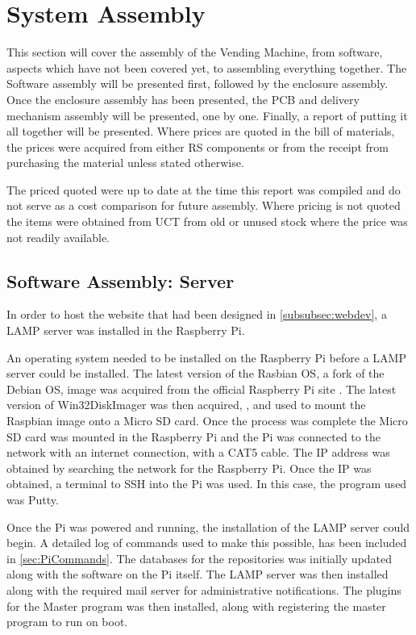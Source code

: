\documentclass[a4paper,11pt]{article}
\numberwithin{figure}{section}
\numberwithin{table}{section}
\begin{document}
\newpage

\section{System Assembly}\thispagestyle{sectionstart}
This section will cover the assembly of the Vending Machine, from software, aspects which have not been covered yet, to assembling everything together. The Software assembly will be presented first, followed by the enclosure assembly. Once the enclosure assembly has been presented, the PCB and delivery mechanism assembly will be presented, one by one. Finally, a report of putting it all together will be presented. Where prices are quoted in the bill of materials, the prices were acquired from either RS components \cite{rsonline} or from the receipt from purchasing the material unless stated otherwise.

The priced quoted were up to date at the time this report was compiled and do not serve as a cost comparison for future assembly. Where pricing is not quoted the items were obtained from UCT from old or unused stock where the price was not readily available.

\subsection{Software Assembly: Server}

In order to host the website that had been designed in \autoref{subsubsec:webdev}, a LAMP server was installed in the Raspberry Pi.

An operating system needed to be installed on the Raspberry Pi before a LAMP server could be installed. The latest version of the Rasbian OS, a fork of the Debian OS, image was acquired from the official Raspberry Pi site \cite{raspbian}. The latest version of Win32DiskImager was then acquired, \cite{diskimage}, and used to mount the Raspbian image onto a Micro SD card. Once the process was complete the Micro SD card was mounted in the Raspberry Pi and the Pi was connected to the network with an internet connection, with a CAT5 cable. The IP address was obtained by searching the network for the Raspberry Pi. Once the IP was obtained, a terminal to SSH into the Pi was used. In this case, the program used was Putty.

Once the Pi was powered and running, the installation of the LAMP server could begin. A detailed log of commands used to make this possible, has been included in \autoref{sec:PiCommands}. The databases for the repositories was initially updated along with the software on the Pi itself. The LAMP server was then installed along with the required mail server for administrative notifications. The plugins for the Master program was then installed, along with registering the master program to run on boot.
\end{document}
